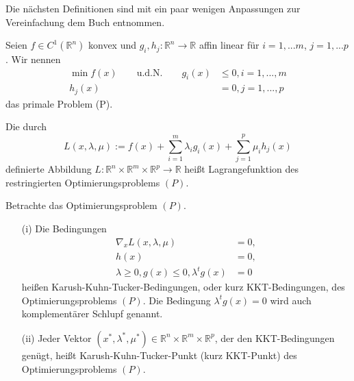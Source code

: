 Die nächsten Definitionen sind mit ein paar wenigen Anpassungen zur Vereinfachung dem Buch \cite{gk-tnro} entnommen.

\begin{definition}
	Seien $f \in C^1(\mathbb{R}^n)$ konvex und $g_i,h_j :\mathbb{R}^n \rightarrow \mathbb{R}$ affin linear für $i=1,...m$, $j=1,...p$. Wir nennen
	\begin{equation}
	\begin{aligned}
	\min f(x) \qquad \text{u.d.N.} \qquad g_i(x) & \leq 0, i = 1,...,m \\
	h_j(x) &=0, j = 1,...,p
	\end{aligned}
	\end{equation}
	das primale Problem (P).
\end{definition}

\begin{definition}
	Die durch
	\begin{equation}
	L(x,\lambda,\mu) := f(x)+\sum_{i=1}^m \lambda_i g_i(x) + \sum_{j=1}^p \mu_i h_j(x)
	\end{equation}
	definierte Abbildung $L: \mathbb{R}^n \times \mathbb{R}^m \times \mathbb{R}^p \rightarrow \mathbb{R}$ heißt Lagrangefunktion des restringierten Optimierungsproblems $(P)$.
\end{definition}

\begin{definition}\label{def:kkt}
	Betrachte das Optimierungsproblem $(P)$.
	\begin{itemize}
		\item[(i)] Die Bedingungen
		\begin{equation}
		\begin{aligned}
		\nabla_x L(x,\lambda,\mu) &= 0,\\
		h(x) &= 0, \\
		\lambda \geq 0, g(x) \leq 0, \lambda^t g(x) &= 0
		\end{aligned}
		\end{equation}
		heißen Karush-Kuhn-Tucker-Bedingungen, oder kurz KKT-Bedingungen, des Optimierungsproblems $(P)$. Die Bedingung $\lambda^t g(x)=0$ wird auch komplementärer Schlupf genannt.
		\item[(ii)] Jeder Vektor $(x^*,\lambda^*,\mu^*) \in \mathbb{R}^n \times \mathbb{R}^m \times \mathbb{R}^p$, der den KKT-Bedingungen genügt, heißt Karush-Kuhn-Tucker-Punkt (kurz KKT-Punkt) des Optimierungsproblems $(P)$.	
	\end{itemize}
\end{definition}

